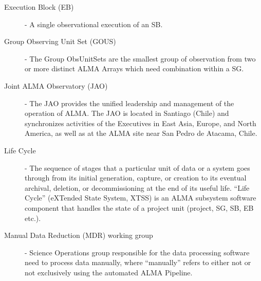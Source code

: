 \begin{description}
\item[Execution Block (EB)] - A single observational execution of an SB.
\item[Group Observing Unit Set (GOUS)] - The Group ObsUnitSets are the smallest group of observation from two or more distinct ALMA Arrays which need combination within a SG.
\item[Joint ALMA Observatory (JAO)] - The JAO provides the unified leadership and management of the operation of ALMA. The JAO is located in Santiago (Chile) and synchronizes activities of the Executives in East Asia, Europe, and North America, as well as at the ALMA site near San Pedro de Atacama, Chile. 
\item[Life Cycle] - The sequence of stages that a particular unit of data or a system goes through from its initial generation, capture, or creation to its eventual archival, deletion, or decommissioning at the end of its useful life.  ``Life Cycle'' (eXTended State System, XTSS) is an ALMA subsystem software component that handles the state of a project unit (project, SG, SB, EB etc.).  
\item[Manual Data Reduction (MDR) working group] - Science Operations group responsible for the data processing software need to process data manually, where ``manually'' refers to either not or not exclusively using the automated ALMA Pipeline.


\end{description}
